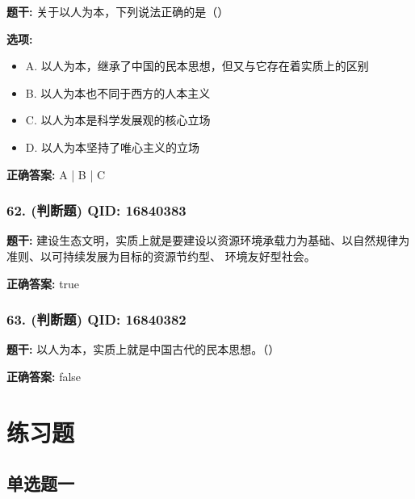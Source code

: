 \documentclass[12pt,UTF8]{ctexart}
\begin{document}
\textbf{题干:}
关于以人为本，下列说法正确的是（）

\textbf{选项:}
\begin{itemize}[leftmargin=*]

  \item A. 以人为本，继承了中国的民本思想，但又与它存在着实质上的区别

  \item B. 以人为本也不同于西方的人本主义

  \item C. 以人为本是科学发展观的核心立场

  \item D. 以人为本坚持了唯心主义的立场

\end{itemize}

\textbf{正确答案:}
A | B | C

\vspace{0.3em}\hrulefill\vspace{0.7em}

\subsubsection*{62. (判断题) \small QID: 16840383}

\textbf{题干:}
建设生态文明，实质上就是要建设以资源环境承载力为基础、以自然规律为准则、以可持续发展为目标的资源节约型、 环境友好型社会。

\textbf{正确答案:}
true

\vspace{0.3em}\hrulefill\vspace{0.7em}

\subsubsection*{63. (判断题) \small QID: 16840382}

\textbf{题干:}
以人为本，实质上就是中国古代的民本思想。（）

\textbf{正确答案:}
false

\vspace{0.3em}\hrulefill\vspace{0.7em}

\section*{练习题}
\hrulefill

\subsection*{单选题一}
\end{document}
